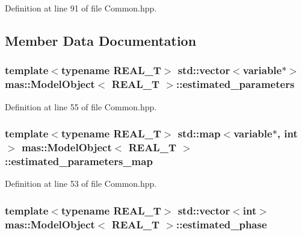 Definition at line 91 of file Common.\-hpp.



\subsection{Member Data Documentation}
\hypertarget{structmas_1_1_model_object_ae9b9d70e413f78bf9b566eba16d1e71c}{
\subsubsection[{estimated\-\_\-parameters}]{\setlength{\rightskip}{0pt plus 5cm}template$<$typename R\-E\-A\-L\-\_\-\-T$>$ std\-::vector$<${\bf variable}$\ast$$>$ {\bf mas\-::\-Model\-Object}$<$ R\-E\-A\-L\-\_\-\-T $>$\-::estimated\-\_\-parameters}}\label{structmas_1_1_model_object_ae9b9d70e413f78bf9b566eba16d1e71c}


Definition at line 55 of file Common.\-hpp.

\hypertarget{structmas_1_1_model_object_aaea24720c307701c6c4494088013cc46}{
\subsubsection[{estimated\-\_\-parameters\-\_\-map}]{\setlength{\rightskip}{0pt plus 5cm}template$<$typename R\-E\-A\-L\-\_\-\-T$>$ std\-::map$<${\bf variable}$\ast$, int$>$ {\bf mas\-::\-Model\-Object}$<$ R\-E\-A\-L\-\_\-\-T $>$\-::estimated\-\_\-parameters\-\_\-map}}\label{structmas_1_1_model_object_aaea24720c307701c6c4494088013cc46}


Definition at line 53 of file Common.\-hpp.

\hypertarget{structmas_1_1_model_object_a6e26b63869a25bbe17a8d57e4d4ab77a}{
\subsubsection[{estimated\-\_\-phase}]{\setlength{\rightskip}{0pt plus 5cm}template$<$typename R\-E\-A\-L\-\_\-\-T$>$ std\-::vector$<$int$>$ {\bf mas\-::\-Model\-Object}$<$ R\-E\-A\-L\-\_\-\-T $>$\-::estimated\-\_\-phase}}\label{structmas_1_1_model_object_a6e26b63869a25bbe17a8d57e4d4ab77a}


